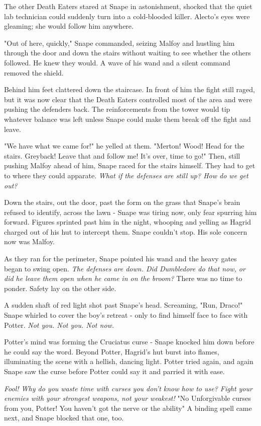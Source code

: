 The other Death Eaters stared at Snape in astonishment, shocked that the quiet lab technician could suddenly turn into a cold-blooded killer. Alecto's eyes were gleaming; she would follow him anywhere.

"Out of here, quickly," Snape commanded, seizing Malfoy and hustling him through the door and down the stairs without waiting to see whether the others followed. He knew they would. A wave of his wand and a silent command removed the shield.

Behind him feet clattered down the staircase. In front of him the fight still raged, but it was now clear that the Death Eaters controlled most of the area and were pushing the defenders back. The reinforcements from the tower would tip whatever balance was left unless Snape could make them break off the fight and leave.

"We have what we came for!" he yelled at them. "Merton! Wood! Head for the stairs. Greyback! Leave that and follow me! It's over, time to go!" Then, still pushing Malfoy ahead of him, Snape raced for the stairs himself. They had to get to where they could apparate. \emph{What if the defenses are still up? How do we get out?}

Down the stairs, out the door, past the form on the grass that Snape's brain refused to identify, across the lawn - Snape was tiring now, only fear spurring him forward. Figures sprinted past him in the night, whooping and yelling as Hagrid charged out of his hut to intercept them. Snape couldn't stop. His sole concern now was Malfoy.

As they ran for the perimeter, Snape pointed his wand and the heavy gates began to swing open. \emph{The defenses are down. Did Dumbledore do that now, or did he leave them open when he came in on the broom?} There was no time to ponder. Safety lay on the other side.

A sudden shaft of red light shot past Snape's head. Screaming, "Run, Draco!" Snape whirled to cover the boy's retreat - only to find himself face to face with Potter. \emph{Not you. Not you. Not now.}

Potter's mind was forming the Cruciatus curse - Snape knocked him down before he could say the word. Beyond Potter, Hagrid's hut burst into flames, illuminating the scene with a hellish, dancing light. Potter tried again, and again Snape saw the curse before Potter could say it and parried it with ease.

\emph{Fool! Why do you waste time with curses you don't know how to use? Fight your enemies with your strongest weapons, not your weakest!} "No Unforgivable curses from you, Potter! You haven't got the nerve or the ability{\el}" A binding spell came next, and Snape blocked that one, too.

